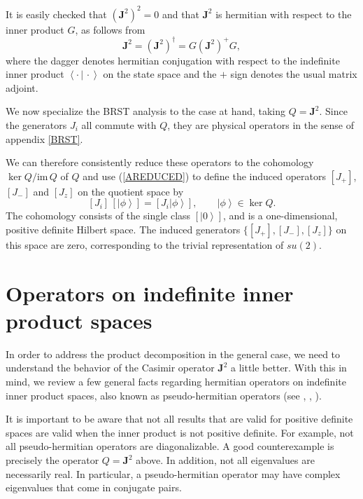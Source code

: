 \documentclass[a4paper,dvips,12pt]{article}
\newcommand {\ket}[1] {\left| #1 \right>}
\newcommand {\braket}[2] {\left< { \left. #1 \,\right|} \,#2 \right>}
\newcommand {\im} {\mathrm{im}\,}
\begin{document}
    It is easily checked that $(\mathbf{J}^2)^2 = 0$ and that $\mathbf{J}^2$
    is hermitian
    with respect to the inner product $G$, as follows from
    \[
        \mathbf{J}^2 = (\mathbf{J}^2)^\dagger = G (\mathbf{J}^2)^+ G,
    \]
    where the dagger denotes hermitian conjugation with respect to
    the indefinite inner product $\braket{\cdot}{\cdot}$ on the state space and
    the $+$ sign denotes the usual matrix
    adjoint.

    We now specialize the BRST analysis to the case at hand,
    taking $Q = \mathbf{J}^2$.
    Since the generators
    $J_i$ all commute with $Q$, they are physical
    operators in the sense of appendix \ref{BRST}.

    We can therefore consistently reduce these operators to the
    cohomology $\ker Q/\im Q$ of $Q$
    and use (\ref{AREDUCED})
    to define the induced
    operators  $[J_+]$, $[J_-]$ and $[J_z]$ on the quotient space
    by
    \[
      [J_i] \,[\ket{\phi}] = [J_i \ket{\phi}], \qquad \ket{\phi} \in \ker Q.
    \]
    The cohomology consists of the single class $[\ket{0}]$,
    and is a one-dimensional, positive definite Hilbert space.
    The induced generators $\{[J_+], [J_-], [J_z]\}$ on this space
    are zero, corresponding to the trivial
    representation of $su(2)$.


    \section{Operators on indefinite inner product spaces}

    In order to address the product decomposition in the general case,
    we need to understand the behavior of the Casimir operator $\mathbf{J}^2$
    a little better.  With this in mind,
    we review a few
    general facts regarding hermitian operators on indefinite inner
    product spaces, also known as pseudo-hermitian operators (see \cite{BOGNAR},
    \cite{MALCEV}, \cite{JACOBZYK}).

    It is important to be aware that not all results
    that are valid for positive definite spaces are valid when the
    inner product is not positive definite.  For example, not all
    pseudo-hermitian operators are diagonalizable.  A good
    counterexample is precisely the operator $Q = \mathbf{J}^2$ above.
    In addition, not all eigenvalues are necessarily real.  In
    particular, a pseudo-hermitian operator may have complex
    eigenvalues that come in conjugate pairs.
\end{document}
